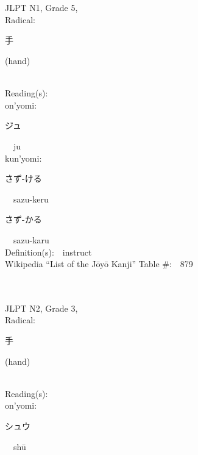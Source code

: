 \begin{multicols}{2}
\ \ \\
{\fontsize{34pt}{40pt}  }\ \ \\  %
{JLPT N1, Grade 5, \\Radical:\ \ {\begin{CJK}{UTF8}{min} 手 \end{CJK}} (hand) } \\
Reading(s):\ \ \\
{\hspace*{1em}}on'yomi:\ \ \\
{\hspace*{2em}}{\begin{CJK}{UTF8}{min} ジュ \end{CJK}}\ \ ju\ \ \\
{\hspace*{1em}}kun'yomi:\ \ \\
{\hspace*{2em}}{\begin{CJK}{UTF8}{min} さず-ける \end{CJK}}\ \ sazu-keru\ \ \\
{\hspace*{2em}}{\begin{CJK}{UTF8}{min} さず-かる \end{CJK}}\ \ sazu-karu\ \ \\
Definition(s):\ \ instruct \\
Wikipedia ``List of the J\=oy\=o Kanji'' Table \#:\ \ 879 \\
\ \ \\
{\fontsize{34pt}{40pt}  }\ \ \\  %
{JLPT N2, Grade 3, \\Radical:\ \ {\begin{CJK}{UTF8}{min} 手 \end{CJK}} (hand) } \\
Reading(s):\ \ \\
{\hspace*{1em}}on'yomi:\ \ \\
{\hspace*{2em}}{\begin{CJK}{UTF8}{min} シュウ \end{CJK}}\ \ sh\=u\ \ \\

\end{multicols}
